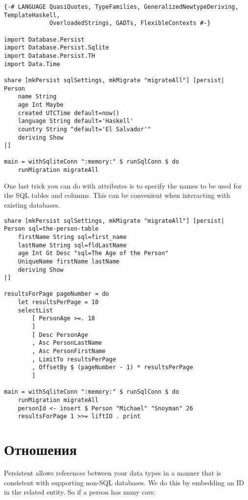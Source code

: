 \begin{lstlisting}
{-# LANGUAGE QuasiQuotes, TypeFamilies, GeneralizedNewtypeDeriving, TemplateHaskell,
             OverloadedStrings, GADTs, FlexibleContexts #-}

import Database.Persist
import Database.Persist.Sqlite
import Database.Persist.TH
import Data.Time

share [mkPersist sqlSettings, mkMigrate "migrateAll"] [persist|
Person
    name String
    age Int Maybe
    created UTCTime default=now()
    language String default='Haskell'
    country String "default='El Salvador'"
    deriving Show
|]

main = withSqliteConn ":memory:" $ runSqlConn $ do
    runMigration migrateAll
\end{lstlisting}%
 
One last trick you can do with attributes is to specify the names to be used for the SQL tables and columns. This can be convenient when interacting with existing databases.

\begin{lstlisting}
share [mkPersist sqlSettings, mkMigrate "migrateAll"] [persist|
Person sql=the-person-table
    firstName String sql=first_name
    lastName String sql=fldLastName
    age Int Gt Desc "sql=The Age of the Person"
    UniqueName firstName lastName
    deriving Show
|]

resultsForPage pageNumber = do
    let resultsPerPage = 10
    selectList
        [ PersonAge >=. 18
        ]
        [ Desc PersonAge
        , Asc PersonLastName
        , Asc PersonFirstName
        , LimitTo resultsPerPage
        , OffsetBy $ (pageNumber - 1) * resultsPerPage
        ]

main = withSqliteConn ":memory:" $ runSqlConn $ do
    runMigration migrateAll
    personId <- insert $ Person "Michael" "Snoyman" 26
    resultsForPage 1 >>= liftIO . print
\end{lstlisting}%

\section{Отношения} %

Persistent allows references between your data types in a manner that is consistent with supporting non-SQL databases. We do this by embedding an ID in the related entity. So if a person has many cars:


